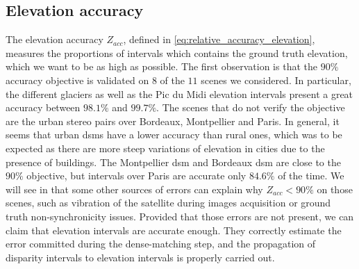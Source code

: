 \subsection{Elevation accuracy}
The elevation accuracy $Z_{acc}$, defined in \cref{eq:relative_accuracy_elevation}, measures the proportions of intervals which contains the ground truth elevation, which we want to be as high as possible. The first observation is that the $90\%$ accuracy objective is validated on $8$ of the $11$ scenes we considered. In particular, the different glaciers as well as the Pic du Midi elevation intervals present a great accuracy between $98.1\%$ and $99.7\%$. The scenes that do not verify the objective are the urban stereo pairs over Bordeaux, Montpellier and Paris. In general, it seems that urban \acrshort{dsm}s have a lower accuracy than rural ones, which was to be expected as there are more steep variations of elevation in cities due to the presence of buildings. The Montpellier \acrshort{dsm} and Bordeaux \acrshort{dsm} are close to the $90\%$ objective, but intervals over Paris are accurate only $84.6\%$ of the time. We will see in  that some other sources of errors can explain why $Z_{acc}<90\%$ on those scenes, such as vibration of the satellite during images acquisition or ground truth non-synchronicity issues. Provided that those errors are not present, we can claim that elevation intervals are accurate enough. They correctly estimate the error committed during the dense-matching step, and the propagation of disparity intervals to elevation intervals is properly carried out.

